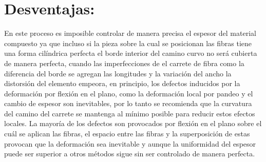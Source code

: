 \section{ \textbf{Desventajas}: }
En este proceso es imposible controlar de manera precisa el espesor del material compuesto ya que incluso si la pieza sobre la cual se posicionan las fibras tiene una forma cilíndrica perfecta el borde interior del camino curvo no será cubierta de manera perfecta, cuando las imperfecciones de el carrete de fibra como la diferencia del borde se agregan las longitudes y la variación del ancho la distorsión del elemento empeora, en principio, los defectos inducidos por la deformación por flexión en el plano, como la deformación local por pandeo y el cambio de espesor son inevitables, por lo tanto se recomienda que la curvatura del camino del carrete se mantenga al mínimo posible para reducir estos efectos locales. La mayoría de los defectos son provocados por flexión en el plano sobre el cuál se aplican las fibras, el espacio entre las fibras y la superposición de estas provocan que la deformación sea inevitable y aunque la uniformidad del espesor puede ser superior a otros métodos sigue sin ser controlado de manera perfecta.

\textbf{}